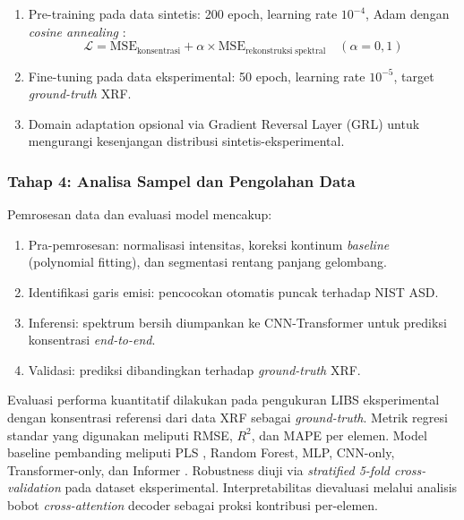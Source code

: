 \documentclass[12pt, a4paper]{article}
\begin{document}
\begin{enumerate}[label=\arabic*., leftmargin=2cm]
    \item Pre-training pada data sintetis: 200 epoch, learning rate $10^{-4}$, Adam \citep{kingma2015} dengan \textit{cosine annealing} \citep{loshchilov2017}:
    \begin{equation}
        \mathcal{L} = \mathrm{MSE}_\mathrm{konsentrasi} + \alpha \times \mathrm{MSE}_\mathrm{rekonstruksi\;spektral} \quad (\alpha = 0{,}1)
    \end{equation}

    \item Fine-tuning pada data eksperimental: 50 epoch, learning rate $10^{-5}$, target \textit{ground-truth} XRF.

    \item Domain adaptation opsional via Gradient Reversal Layer (GRL) \citep{ganin2016} untuk mengurangi kesenjangan distribusi sintetis-eksperimental.
\end{enumerate}


\subsubsection{Tahap 4: Analisa Sampel dan Pengolahan Data}

Pemrosesan data dan evaluasi model mencakup:
\begin{enumerate}[leftmargin=2cm]
    \item Pra-pemrosesan: normalisasi intensitas, koreksi kontinum \textit{baseline} (polynomial fitting), dan segmentasi rentang panjang gelombang.
    \item Identifikasi garis emisi: pencocokan otomatis puncak terhadap NIST ASD.
    \item Inferensi: spektrum bersih diumpankan ke CNN-Transformer untuk prediksi konsentrasi \textit{end-to-end}.
    \item Validasi: prediksi dibandingkan terhadap \textit{ground-truth} XRF.
\end{enumerate}

Evaluasi performa kuantitatif dilakukan pada pengukuran LIBS eksperimental dengan konsentrasi referensi dari data XRF sebagai \textit{ground-truth}. Metrik regresi standar yang digunakan meliputi RMSE, $R^2$, dan MAPE per elemen. Model baseline pembanding meliputi PLS \citep{wold2001}, Random Forest, MLP, CNN-only, Transformer-only, dan Informer \citep{zhou2021, walidain_informer-based_2026}. Robustness diuji via \textit{stratified 5-fold cross-validation} pada dataset eksperimental. Interpretabilitas dievaluasi melalui analisis bobot \textit{cross-attention} decoder sebagai proksi kontribusi per-elemen.
\end{document}
